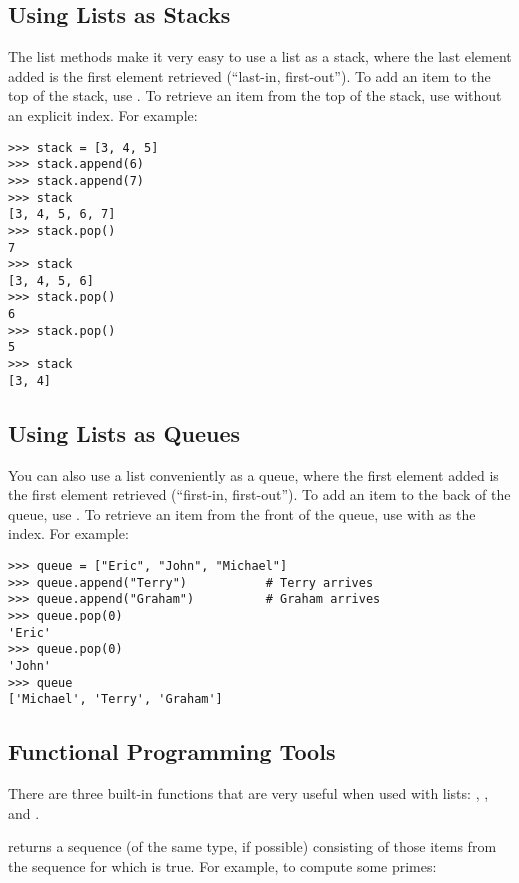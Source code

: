 \documentclass{manual}
\begin{document}
\subsection{Using Lists as Stacks \label{lists-as-stacks}}

The list methods make it very easy to use a list as a stack, where the
last element added is the first element retrieved (``last-in,
first-out'').  To add an item to the top of the stack, use
.  To retrieve an item from the top of the stack, use
 without an explicit index.  For example:

\begin{verbatim}
>>> stack = [3, 4, 5]
>>> stack.append(6)
>>> stack.append(7)
>>> stack
[3, 4, 5, 6, 7]
>>> stack.pop()
7
>>> stack
[3, 4, 5, 6]
>>> stack.pop()
6
>>> stack.pop()
5
>>> stack
[3, 4]
\end{verbatim}


\subsection{Using Lists as Queues \label{lists-as-queues}}

You can also use a list conveniently as a queue, where the first
element added is the first element retrieved (``first-in,
first-out'').  To add an item to the back of the queue, use
.  To retrieve an item from the front of the queue,
use  with  as the index.  For example:

\begin{verbatim}
>>> queue = ["Eric", "John", "Michael"]
>>> queue.append("Terry")           # Terry arrives
>>> queue.append("Graham")          # Graham arrives
>>> queue.pop(0)
'Eric'
>>> queue.pop(0)
'John'
>>> queue
['Michael', 'Terry', 'Graham']
\end{verbatim}


\subsection{Functional Programming Tools \label{functional}}

There are three built-in functions that are very useful when used with
lists: , , and .

 returns a sequence (of
the same type, if possible) consisting of those items from the
sequence for which  is true.  For
example, to compute some primes:
\end{document}
